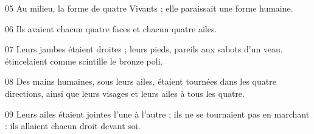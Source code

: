 
05 Au milieu, la forme de quatre Vivants ; elle paraissait une forme humaine.

06 Ils avaient chacun quatre faces et chacun quatre ailes.

07 Leurs jambes étaient droites ; leurs pieds, pareils aux sabots d’un veau, étincelaient comme scintille le bronze poli.

08 Des mains humaines, sous leurs ailes, étaient tournées dans les quatre directions, ainsi que leurs visages et leurs ailes à tous les quatre.

09 Leurs ailes étaient jointes l’une à l’autre ; ils ne se tournaient pas en marchant : ils allaient chacun droit devant soi.
